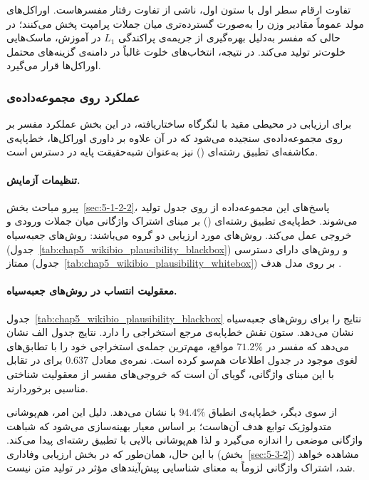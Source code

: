 تفاوت ارقام سطر اول با ستون اول، ناشی از تفاوت رفتار مفسرهاست. اوراکل‌های مولد عموماً مقادیر وزن را به‌صورت گسترده‌تری میان جملات پرامپت پخش می‌کنند؛ در حالی که مفسر  به‌دلیل بهره‌گیری از جریمه‌ی پراکندگی $L_1$ در آموزش، ماسک‌هایی خلوت‌تر تولید می‌کند. در نتیجه، انتخاب‌های خلوت  غالباً در دامنه‌ی گزینه‌های محتمل اوراکل‌ها قرار می‌گیرد.


\subsubsection{عملکرد روی مجموعه‌داده‌ی }\label{sec:5-3-1-2}

برای ارزیابی در محیطی مقید با لنگرگاه ساختاریافته، در این بخش عملکرد مفسر بر روی مجموعه‌داده‌ی  سنجیده می‌شود که در آن علاوه بر داوری اوراکل‌ها، خط‌پایه‌ی مکاشفه‌ای تطبیق رشته‌ای () نیز به‌عنوان شبه‌حقیقت پایه در دسترس است.

\paragraph{تنظیمات آزمایش.}
پیرو مباحث بخش~\ref{sec:5-1-2-2}، پاسخ‌های این مجموعه‌داده از روی جدول تولید می‌شوند. خط‌پایه‌ی تطبیق رشته‌ای () بر مبنای اشتراک واژگانی میان جملات ورودی و خروجی عمل می‌کند. روش‌های مورد ارزیابی دو گروه می‌باشند: روش‌های جعبه‌سیاه (جدول~\ref{tab:chap5_wikibio_plausibility_blackbox}) و روش‌های دارای دسترسی ممتاز (جدول~\ref{tab:chap5_wikibio_plausibility_whitebox}) بر روی مدل هدف .

\paragraph{معقولیت انتساب در روش‌های جعبه‌سیاه.}
جدول~\ref{tab:chap5_wikibio_plausibility_blackbox} نتایج را برای روش‌های جعبه‌سیاه نشان می‌دهد. ستون  نقش خط‌پایه‌ی مرجع استخراجی را دارد. نتایج جدول الف نشان می‌دهد که مفسر  در $71.2\%$ مواقع، مهم‌ترین جمله‌ی استخراجی خود را با تطابق‌های لغوی موجود در جدول اطلاعات هم‌سو کرده است. نمره‌ی  معادل $0.637$ برای  در تقابل با این مبنای واژگانی، گویای آن است که خروجی‌های مفسر از معقولیت شناختی مناسبی برخوردارند.

از سوی دیگر، خط‌پایه‌ی  انطباق $94.4\%$ با  نشان می‌دهد. دلیل این امر، هم‌پوشانی متدولوژیک توابع هدف آن‌هاست؛  بر اساس معیار  بهینه‌سازی می‌شود که شباهت واژگانی موضعی را اندازه می‌گیرد و لذا هم‌پوشانی بالایی با تطبیق رشته‌ای پیدا می‌کند. با این حال، همان‌طور که در بخش ارزیابی وفاداری (بخش~\ref{sec:5-3-2}) مشاهده خواهد شد، اشتراک واژگانی لزوماً به معنای شناسایی پیش‌آیندهای مؤثر در تولید متن نیست.

